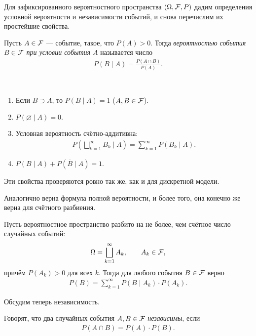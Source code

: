 \documentclass[../main.tex]{subfiles}
\begin{document}
Для зафиксированного вероятностного пространства $ (\Omega,\mathcal F,P) $ дадим определения условной вероятности и независимости событий, и снова перечислим их простейшие свойства.

\begin{df}
 Пусть $A \in \mathcal F$ --- событие, такое, что $P(A) > 0$. Тогда \textit{вероятностью события $B \in \mathcal F$ при условии события $A$} называется число
 \begin{align*}
  P(B \mid A) = \frac{P(A\cap B)}{P(A)}.
 \end{align*}
\end{df}

\begin{prop}\
 \begin{enumerate}
  \item Если $ B \supset A $, то $ P(B\mid A) = 1 $ ($ A,B\in\mathcal F $).
  \item $ P(\varnothing \mid A) = 0 $.
  \item Условная вероятность счётно-аддитивна:
   \begin{align*}
    P \left( \bigsqcup_{k=1}^{\infty} B_k \mid A \right) = \sum_{k=1}^{\infty}P(B_k \mid A).
   \end{align*}
  \item $ P(B \mid A) + P(\overline B \mid A) = 1 $.
 \end{enumerate}
\end{prop}

Эти свойства проверяются ровно так же, как и для дискретной модели.

Аналогично верна формула полной вероятности, и более того, она конечно же верна для счётного разбиения.

\begin{prop}
 Пусть вероятностное пространство разбито на не более, чем счётное число случайных событий:
 \begin{align*}
  \Omega = \bigsqcup_{k=1}^{\infty} A_k, \qquad A_k \in \mathcal F,
 \end{align*} причём $ P(A_k) > 0 $ для всех  $ k $. Тогда для любого события $ B \in \mathcal F $  верно
 \begin{align*}
  P(B) = \sum_{k=1}^{\infty} P(B \mid A_k) \cdot P(A_k).
 \end{align*}
\end{prop}

Обсудим теперь независимость.

\begin{df}
 Говорят, что два случайных события $A, B \in \mathcal F$ \textit{независимы}, если
 \begin{align*}
  P(A \cap B) = P(A) \cdot P(B).
 \end{align*}
\end{df}
\end{document}
